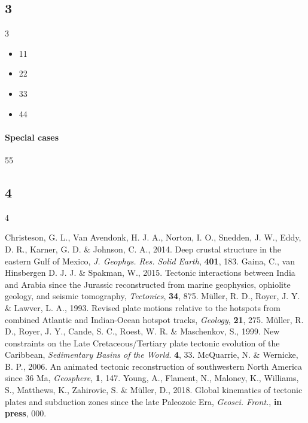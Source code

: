 \subsection{3}
3

\begin{itemize}
\item 11
\item 22
\item 33
\item 44
\end{itemize}

\paragraph{Special cases} 55

\subsection{4}
4

\begin{thebibliography}{}
  Christeson, G. L., Van Avendonk, H. J. A., Norton, I. O., Snedden, J. W.,
  Eddy, D. R., Karner, G. D. \& Johnson, C. A., 2014. Deep crustal structure in
  the eastern Gulf of Mexico, \textit{J. Geophys. Res. Solid Earth},
  \textbf{401}, 183.
  Gaina, C., van Hinsbergen D. J. J. \& Spakman, W., 2015. Tectonic interactions
  between India and Arabia since the Jurassic reconstructed from marine
  geophysics, ophiolite geology, and seismic tomography, \textit{Tectonics},
  \textbf{34}, 875.
  M{\"{u}}ller, R. D., Royer, J. Y. \& Lawver, L. A., 1993. Revised plate
  motions relative to the hotspots from combined Atlantic and Indian-Ocean
  hotspot tracks, \textit{Geology}, \textbf{21}, 275.
  M{\"{u}}ller, R. D., Royer, J. Y., Cande, S. C., Roest, W. R. \& Maschenkov,
  S., 1999. New constraints on the Late Cretaceous/Tertiary plate tectonic
  evolution of the Caribbean, \textit{Sedimentary Basins of the World}.
  \textbf{4}, 33.
  McQuarrie, N. \& Wernicke, B. P., 2006. An animated tectonic reconstruction of
  southwestern North America since 36 Ma, \textit{Geosphere}, \textbf{1},
  147.
  Young, A., Flament, N., Maloney, K., Williams, S., Matthews, K., Zahirovic,
  S.
  \& Müller, D., 2018. Global kinematics of tectonic plates and subduction zones
  since the late Paleozoic Era, \textit{Geosci. Front.},
  \textbf{in press}, 000.
\end{thebibliography}\label{lastpage}
